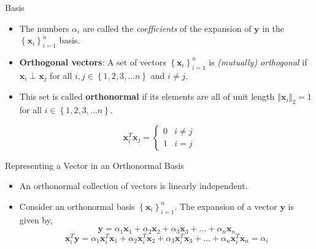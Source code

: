 \documentclass[aspectratio=169]{beamer}
\let\olditem\item
\renewcommand{\item}{\setlength{\itemsep}{\fill}\olditem}
\begin{document}
\begin{frame}[t]{Basis}
\begin{itemize}
  \item The numbers $\alpha_i$ are called the \textit{coefficients} of the expansion of $\mathbf{y}$ in the $\left\{\mathbf{x}_i\right\}_{i=1}^n$ basis.
  
  \item \textbf{Orthogonal vectors}: A set of vectors $\left\{\mathbf{x}_i\right\}_{i=1}^n$ is \textit{(mutually) orthogonal} if $\mathbf{x}_i \perp \mathbf{x}_j$ for all $i, j \in \left\{1, 2, 3, \ldots n\right\}$ and $i \neq j$.
  
  \item This set is called \textbf{orthonormal} if its elements are all of unit length $\left\Vert \mathbf{x}_i \right\Vert_2 = 1$ for all $i \in \left\{1, 2, 3, \ldots n\right\}$.
\end{itemize}
\[ \mathbf{x}_i^T\mathbf{x}_j = \begin{cases} 
      0 & i \neq j \\
      1 & i = j 
   \end{cases}
\]
\end{frame}


\begin{frame}[t]{Representing a Vector in an Orthonormal Basis}
\begin{itemize}
\item An orthonormal collection of vectors is linearly independent.
\item Consider an orthonormal basis $\left\{\mathbf{x}_i\right\}_{i=1}^{n}$. The expansion of a vector $\mathbf{y}$ is given by,
\[ \mathbf{y} = \alpha_1\mathbf{x}_1 + \alpha_2\mathbf{x}_2 + \alpha_3\mathbf{x}_3 + \ldots + \alpha_n\mathbf{x}_n \]
\[ \mathbf{x}_i^T\mathbf{y} = \alpha_1\mathbf{x}_i^T\mathbf{x}_1 + \alpha_2\mathbf{x}_i^T\mathbf{x}_2 + \alpha_3\mathbf{x}_i^T\mathbf{x}_3 + \ldots + \alpha_n\mathbf{x}_i^T\mathbf{x}_n = \alpha_i\]
\end{itemize}
\end{frame}
\end{document}
